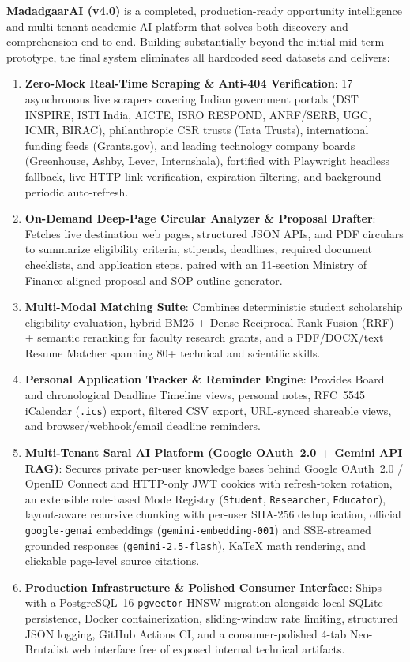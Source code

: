 \documentclass[12pt,a4paper,oneside]{report}
\begin{document}
\textbf{MadadgaarAI (v4.0)} is a completed, production-ready opportunity intelligence and multi-tenant academic AI platform that solves both discovery and comprehension end to end. Building substantially beyond the initial mid-term prototype, the final system eliminates all hardcoded seed datasets and delivers:
\begin{enumerate}[itemsep=2pt]
    \item \textbf{Zero-Mock Real-Time Scraping \& Anti-404 Verification}: 17 asynchronous live scrapers covering Indian government portals (DST INSPIRE, ISTI India, AICTE, ISRO RESPOND, ANRF/SERB, UGC, ICMR, BIRAC), philanthropic CSR trusts (Tata Trusts), international funding feeds (Grants.gov), and leading technology company boards (Greenhouse, Ashby, Lever, Internshala), fortified with Playwright headless fallback, live HTTP link verification, expiration filtering, and background periodic auto-refresh.
    \item \textbf{On-Demand Deep-Page Circular Analyzer \& Proposal Drafter}: Fetches live destination web pages, structured JSON APIs, and PDF circulars to summarize eligibility criteria, stipends, deadlines, required document checklists, and application steps, paired with an 11-section Ministry of Finance-aligned proposal and SOP outline generator.
    \item \textbf{Multi-Modal Matching Suite}: Combines deterministic student scholarship eligibility evaluation, hybrid BM25 + Dense Reciprocal Rank Fusion (RRF) + semantic reranking for faculty research grants, and a PDF/DOCX/text Resume Matcher spanning 80+ technical and scientific skills.
    \item \textbf{Personal Application Tracker \& Reminder Engine}: Provides Board and chronological Deadline Timeline views, personal notes, RFC~5545 iCalendar (\texttt{.ics}) export, filtered CSV export, URL-synced shareable views, and browser/webhook/email deadline reminders.
    \item \textbf{Multi-Tenant Saral AI Platform (Google OAuth~2.0 + Gemini API RAG)}: Secures private per-user knowledge bases behind Google OAuth~2.0 / OpenID Connect and HTTP-only JWT cookies with refresh-token rotation, an extensible role-based Mode Registry (\texttt{Student}, \texttt{Researcher}, \texttt{Educator}), layout-aware recursive chunking with per-user SHA-256 deduplication, official \texttt{google-genai} embeddings (\texttt{gemini-embedding-001}) and SSE-streamed grounded responses (\texttt{gemini-2.5-flash}), KaTeX math rendering, and clickable page-level source citations.
    \item \textbf{Production Infrastructure \& Polished Consumer Interface}: Ships with a PostgreSQL~16 \texttt{pgvector} HNSW migration alongside local SQLite persistence, Docker containerization, sliding-window rate limiting, structured JSON logging, GitHub Actions CI, and a consumer-polished 4-tab Neo-Brutalist web interface free of exposed internal technical artifacts.
\end{enumerate}
\end{document}
